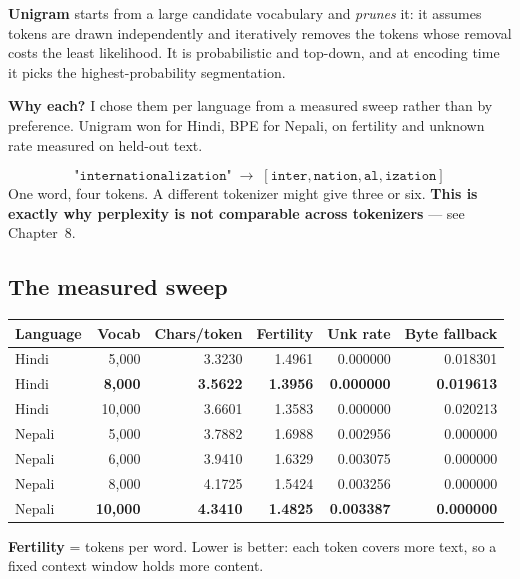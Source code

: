 \documentclass[11pt]{report}
\begin{document}
\textbf{Unigram} starts from a large candidate vocabulary and \emph{prunes} it:
it assumes tokens are drawn independently and iteratively removes the tokens
whose removal costs the least likelihood. It is probabilistic and top-down, and
at encoding time it picks the highest-probability segmentation.

\textbf{Why each?} I chose them per language from a measured sweep rather than
by preference. Unigram won for Hindi, BPE for Nepali, on fertility and unknown
rate measured on held-out text.

\begin{vexample}
\[
\texttt{"internationalization"} \;\longrightarrow\;
[\texttt{inter}, \texttt{nation}, \texttt{al}, \texttt{ization}]
\]
One word, four tokens. A different tokenizer might give three or six.
\textbf{This is exactly why perplexity is not comparable across tokenizers} ---
see Chapter~8.
\end{vexample}

\subsection{The measured sweep}

\begin{center}\small
\begin{tabular}{lrrrrr}
\toprule
\textbf{Language} & \textbf{Vocab} & \textbf{Chars/token} & \textbf{Fertility} & \textbf{Unk rate} & \textbf{Byte fallback} \\
\midrule
Hindi & 5,000 & 3.3230 & 1.4961 & 0.000000 & 0.018301 \\
Hindi & \textbf{8,000} & \textbf{3.5622} & \textbf{1.3956} & \textbf{0.000000} & \textbf{0.019613} \\
Hindi & 10,000 & 3.6601 & 1.3583 & 0.000000 & 0.020213 \\
\midrule
Nepali & 5,000 & 3.7882 & 1.6988 & 0.002956 & 0.000000 \\
Nepali & 6,000 & 3.9410 & 1.6329 & 0.003075 & 0.000000 \\
Nepali & 8,000 & 4.1725 & 1.5424 & 0.003256 & 0.000000 \\
Nepali & \textbf{10,000} & \textbf{4.3410} & \textbf{1.4825} & \textbf{0.003387} & \textbf{0.000000} \\
\bottomrule
\end{tabular}
\end{center}

\textbf{Fertility} = tokens per word. Lower is better: each token covers more
text, so a fixed context window holds more content.
\end{document}
